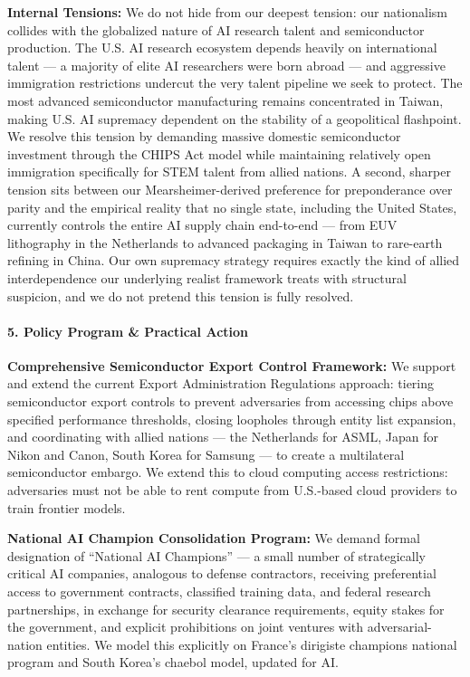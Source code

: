 \textbf{Internal Tensions:} We do not hide from our deepest tension: our
nationalism collides with the globalized nature of AI research talent
and semiconductor production. The U.S. AI research ecosystem depends
heavily on international talent --- a majority of elite AI researchers
were born abroad --- and aggressive immigration restrictions undercut
the very talent pipeline we seek to protect. The most advanced
semiconductor manufacturing remains concentrated in Taiwan, making U.S.
AI supremacy dependent on the stability of a geopolitical flashpoint. We
resolve this tension by demanding massive domestic semiconductor
investment through the CHIPS Act model while maintaining relatively open
immigration specifically for STEM talent from allied nations. A second,
sharper tension sits between our Mearsheimer-derived preference for
preponderance over parity and the empirical reality that no single
state, including the United States, currently controls the entire AI
supply chain end-to-end --- from EUV lithography in the Netherlands to
advanced packaging in Taiwan to rare-earth refining in China. Our own
supremacy strategy requires exactly the kind of allied interdependence
our underlying realist framework treats with structural suspicion, and
we do not pretend this tension is fully resolved.

\paragraph{5. Policy Program \& Practical
Action}\label{policy-program-practical-action-21}

\textbf{Comprehensive Semiconductor Export Control Framework:} We
support and extend the current Export Administration Regulations
approach: tiering semiconductor export controls to prevent adversaries
from accessing chips above specified performance thresholds, closing
loopholes through entity list expansion, and coordinating with allied
nations --- the Netherlands for ASML, Japan for Nikon and Canon, South
Korea for Samsung --- to create a multilateral semiconductor embargo. We
extend this to cloud computing access restrictions: adversaries must not
be able to rent compute from U.S.-based cloud providers to train
frontier models.

\textbf{National AI Champion Consolidation Program:} We demand formal
designation of ``National AI Champions'' --- a small number of
strategically critical AI companies, analogous to defense contractors,
receiving preferential access to government contracts, classified
training data, and federal research partnerships, in exchange for
security clearance requirements, equity stakes for the government, and
explicit prohibitions on joint ventures with adversarial-nation
entities. We model this explicitly on France's dirigiste champions
national program and South Korea's chaebol model, updated for AI.

